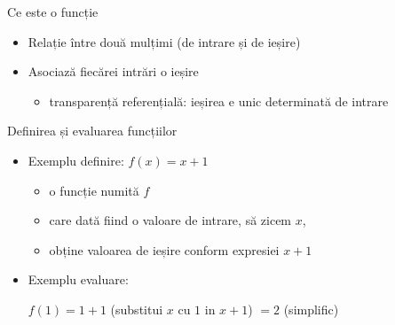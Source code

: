 \documentclass[xcolor=pdftex,romanian,colorlinks]{beamer}
\begin{document}
\begin{frame}{Ce este o funcție}
\protect\hypertarget{ce-este-o-funcux21bie}{}

\begin{itemize}

\item
  Relație între două mulțimi (de intrare și de ieșire)
\item
  Asociază fiecărei intrări  o ieșire

  \begin{itemize}
  
  \item
    transparență referențială: ieșirea e unic determinată de intrare
  \end{itemize}
\end{itemize}

\begin{block}{Definirea și evaluarea funcțiilor}

\begin{itemize}
\item
  Exemplu definire: \(f(x) = x + 1\)

  \begin{itemize}
  
  \item
    o funcție numită \(f\)
  \item
    care dată fiind o valoare de intrare, să zicem \(x\),
  \item
    obține valoarea de ieșire conform expresiei \(x + 1\)
  \end{itemize}
\item
  Exemplu evaluare:

  \(f(1) = 1 + 1\) (substitui \(x\) cu \(1\) in \(x + 1\)) \(= 2\)
  (simplific)
\end{itemize}

\end{block}

\end{frame}
\end{document}
